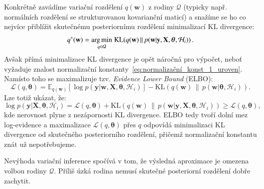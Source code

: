 Konkrétně zavádíme variační rozdělení $q(\mathbf{w})$ z rodiny $\mathcal{Q}$ (typicky např. normálních rozdělení se strukturovanou kovarianční maticí) a snažíme se ho co nejvíce přiblížit skutečnému posteriornímu rozdělení minimalizací KL divergence:
\begin{equation}
  q^*(\mathbf{w}) = \underset{q \in \mathcal{Q}}{\operatorname*{arg\,min}}\; \mathrm{KL}\!\left(q(\mathbf{w}) \,\|\, p(\mathbf{w} | \mathbf{y}, \mathbf{X}, \boldsymbol{\theta}, \mathcal{H}_i)\right).
\end{equation}
Avšak přímá minimalizace KL divergence je opět náročná pro výpočet, neboť vyžaduje znalost normalizační konstanty~\eqref{eq:normalizační_konst_1_uroven}.
Namísto toho se maximalizuje tzv. \textit{Evidence Lower Bound} (ELBO):
\begin{equation}
  \mathcal{L}(q, \boldsymbol{\theta}) = \mathbb{E}_{q(\mathbf{w})}\!\left[\log p(\mathbf{y} | \mathbf{w}, \mathbf{X}, \boldsymbol{\theta}, \mathcal{H}_i)\right] - \mathrm{KL}\!\left(q(\mathbf{w}) \,\|\, p(\mathbf{w} | \boldsymbol{\theta}, \mathcal{H}_i)\right).
  \label{eq:elbo}
\end{equation}
Lze totiž ukázat, že:
\begin{equation}
  \log p(\mathbf{y} | \mathbf{X}, \boldsymbol{\theta}, \mathcal{H}_i) = \mathcal{L}(q, \boldsymbol{\theta}) + \mathrm{KL}\!\left(q(\mathbf{w}) \,\|\, p(\mathbf{w} | \mathbf{y}, \mathbf{X}, \boldsymbol{\theta}, \mathcal{H}_i)\right) \geq \mathcal{L}(q, \boldsymbol{\theta}),
  \label{eq:elbo_dekompozice}
\end{equation}
kde nerovnost plyne z nezápornosti KL divergence.
ELBO tedy tvoří dolní mez log-evidence a maximalizace $\mathcal{L}(q, \boldsymbol{\theta})$ přes $q$ odpovídá minimalizaci KL divergence od skutečného posteriorního rozdělení, přičemž normalizační konstantu znát už nepotřebujeme.
\par

Nevýhoda variační inference spočívá v tom, že výsledná aproximace je omezena volbou rodiny $\mathcal{Q}$. 
Příliš úzká rodina nemusí skutečné posteriorní rozdělení dobře zachytit.

